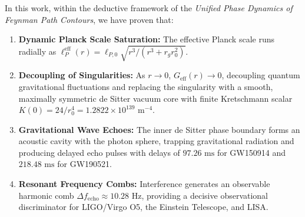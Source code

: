 \documentclass[11pt,a4paper]{article}
\begin{document}
In this work, within the deductive framework of the \textit{Unified Phase Dynamics of Feynman Path Contours}, we have proven that:
\begin{enumerate}
    \item \textbf{Dynamic Planck Scale Saturation:} The effective Planck scale runs radially as $\ell_P^{\mathrm{eff}}(r) = \ell_{P,0}\sqrt{r^3 / (r^3 + r_g r_0^2)}$.
    \item \textbf{Decoupling of Singularities:} As $r \to 0$, $G_{\mathrm{eff}}(r) \to 0$, decoupling quantum gravitational fluctuations and replacing the singularity with a smooth, maximally symmetric de Sitter vacuum core with finite Kretschmann scalar $K(0) = 24/r_0^4 = 1.2822 \times 10^{139}\text{ m}^{-4}$.
    \item \textbf{Gravitational Wave Echoes:} The inner de Sitter phase boundary forms an acoustic cavity with the photon sphere, trapping gravitational radiation and producing delayed echo pulses with delays of $97.26\text{ ms}$ for GW150914 and $218.48\text{ ms}$ for GW190521.
    \item \textbf{Resonant Frequency Combs:} Interference generates an observable harmonic comb $\Delta f_{\mathrm{echo}} \approx 10.28\text{ Hz}$, providing a decisive observational discriminator for LIGO/Virgo O5, the Einstein Telescope, and LISA.
\end{enumerate}
\end{document}
